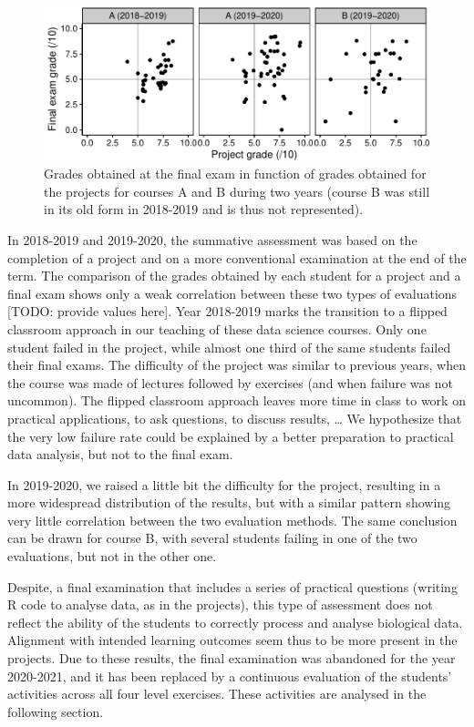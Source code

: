 \documentclass[
]{article}
\begin{document}
\begin{figure}
\centering
\includegraphics{teaching_data_science_files/figure-latex/fig_exams_projects-1.pdf}
\caption{\label{fig:fig_exams_projects} Grades obtained at the final
exam in function of grades obtained for the projects for courses A and B
during two years (course B was still in its old form in 2018-2019 and is
thus not represented).}
\end{figure}

In 2018-2019 and 2019-2020, the summative assessment was based on the
completion of a project and on a more conventional examination at the
end of the term. The comparison of the grades obtained by each student
for a project and a final exam shows only a weak correlation between
these two types of evaluations {[}TODO: provide values here{]}. Year
2018-2019 marks the transition to a flipped classroom approach in our
teaching of these data science courses. Only one student failed in the
project, while almost one third of the same students failed their final
exams. The difficulty of the project was similar to previous years, when
the course was made of lectures followed by exercises (and when failure
was not uncommon). The flipped classroom approach leaves more time in
class to work on practical applications, to ask questions, to discuss
results, \ldots{} We hypothesize that the very low failure rate could be
explained by a better preparation to practical data analysis, but not to
the final exam.

In 2019-2020, we raised a little bit the difficulty for the project,
resulting in a more widespread distribution of the results, but with a
similar pattern showing very little correlation between the two
evaluation methods. The same conclusion can be drawn for course B, with
several students failing in one of the two evaluations, but not in the
other one.

Despite, a final examination that includes a series of practical
questions (writing R code to analyse data, as in the projects), this
type of assessment does not reflect the ability of the students to
correctly process and analyse biological data. Alignment with intended
learning outcomes seem thus to be more present in the projects. Due to
these results, the final examination was abandoned for the year
2020-2021, and it has been replaced by a continuous evaluation of the
students' activities across all four level exercises. These activities
are analysed in the following section.
\end{document}
